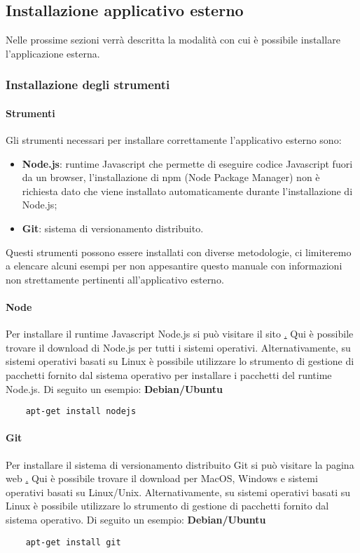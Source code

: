 \subsection{Installazione applicativo esterno}
Nelle prossime sezioni verrà descritta la modalità con cui è possibile installare l'applicazione esterna.

\subsubsection{Installazione degli strumenti}
\paragraph{Strumenti}
Gli strumenti necessari per installare correttamente l'applicativo esterno sono:
\begin{itemize}
    \item \textbf{Node.js}: runtime Javascript che permette di eseguire codice Javascript fuori da un browser, l'installazione di npm (Node Package Manager) non è richiesta dato che viene installato automaticamente durante l'installazione di Node.js;
    \item \textbf{Git}: sistema di versionamento distribuito.
\end{itemize}

Questi strumenti possono essere installati con diverse metodologie, ci limiteremo a elencare alcuni esempi per non appesantire questo manuale con informazioni non strettamente pertinenti all'applicativo esterno.

\paragraph{Node}
Per installare il runtime Javascript Node.js si può visitare il sito \href{https://nodejs.org}. Qui è possibile trovare il download di Node.js per tutti i sistemi operativi. Alternativamente, su sistemi operativi basati su Linux è possibile utilizzare lo strumento di gestione di pacchetti fornito dal sistema operativo per installare i pacchetti del runtime Node.js. Di seguito un esempio:
\textbf{Debian/Ubuntu} \\
\begin{verbatim}
    apt-get install nodejs
\end{verbatim}

\paragraph{Git}
Per installare il sistema di versionamento distribuito Git si può visitare la pagina web \href{https://git-scm.com/downloads}. Qui è possibile trovare il download per MacOS, Windows e sistemi operativi basati su Linux/Unix. Alternativamente, su sistemi operativi basati su Linux è possibile utilizzare lo strumento di gestione di pacchetti fornito dal sistema operativo. Di seguito un esempio:
\textbf{Debian/Ubuntu} \\
\begin{verbatim}
    apt-get install git
\end{verbatim}

